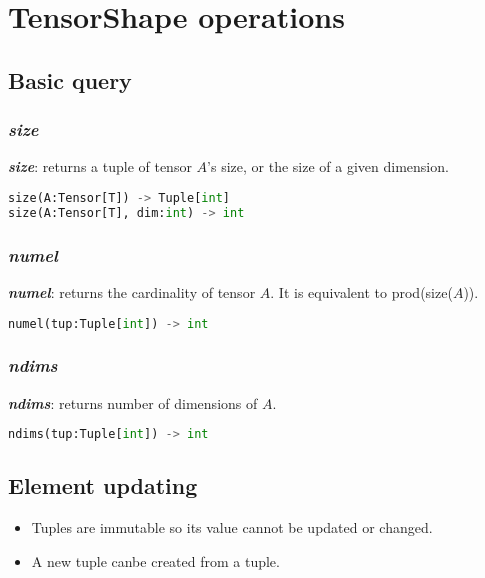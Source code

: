 
\section{TensorShape operations}

\subsection{Basic query}

\subsubsection{\textbf{\textit{size}}}

\textbf{\textit{size}}: returns a tuple of tensor $A$'s size, or the size of a given dimension.
\begin{lstlisting}[language=Python]
size(A:Tensor[T]) -> Tuple[int]
size(A:Tensor[T], dim:int) -> int
\end{lstlisting}

\subsubsection{\textbf{\textit{numel}}}

\textbf{\textit{numel}}: returns the cardinality of tensor $A$. It is equivalent to prod(size($A$)).
\begin{lstlisting}[language=Python]
numel(tup:Tuple[int]) -> int
\end{lstlisting}

\subsubsection{\textbf{\textit{ndims}}}

\textbf{\textit{ndims}}: returns number of dimensions of $A$.
\begin{lstlisting}[language=Python]
ndims(tup:Tuple[int]) -> int
\end{lstlisting}

\subsection{Element updating}

\begin{itemize}
  \item Tuples are immutable so its value cannot be updated or changed.
  \item A new tuple canbe created from a tuple.
\end{itemize}

